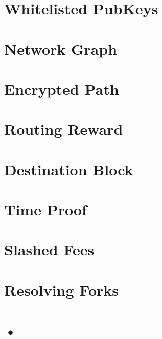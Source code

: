 \documentclass[a4paper,10pt]{article}
\begin{document}
\section{Whitelisted PubKeys}

\section{Network Graph}

\section{Encrypted Path}

\section{Routing Reward}

\section{Destination Block}

\section{Time Proof}

\section{Slashed Fees}

\section{Resolving Forks}

\section{•}
\end{document}
